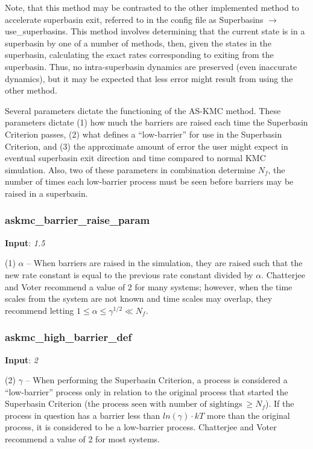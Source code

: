 \documentclass{article}
\begin{document}
Note, that this method may be contrasted to the other implemented method to accelerate superbasin exit, referred to in the config file as Superbasins $\to$ use\_superbasins.  This method involves determining that the current state is in a superbasin by one of a number of methods, then, given the states in the superbasin, calculating the exact rates corresponding to exiting from the superbasin.  Thus, no intra-superbasin dynamics are preserved (even inaccurate dynamics), but it may be expected that less error might result from using the other method.

Several parameters dictate the functioning of the AS-KMC method.  These parameters dictate (1) how much the barriers are raised each time the Superbasin Criterion passes, (2) what defines a ``low-barrier'' for use in the Superbasin Criterion, and (3) the approximate amount of error the user might expect in eventual superbasin exit direction and time compared to normal KMC simulation.  Also, two of these parameters in combination determine $N_f$, the number of times each low-barrier process must be seen before barriers may be raised in a superbasin.

\subsubsection{askmc\_barrier\_raise\_param}

\noindent\textbf{Input}:  \emph{1.5}

(1) $\alpha$ -- When barriers are raised in the simulation, they are raised such that the new rate constant is equal to the previous rate constant divided by $\alpha$. Chatterjee and Voter recommend a value of 2 for many systems; however, when the time scales from the system are not known and time scales may overlap, they recommend letting $1 \le \alpha \le \gamma^{1/2} \ll N_f$.

\subsubsection{askmc\_high\_barrier\_def}

\noindent\textbf{Input}:  \emph{2}

(2) $\gamma$ -- When performing the Superbasin Criterion, a process is considered a ``low-barrier'' process only in relation to the original process that started the Superbasin Criterion ($\text{the process seen with number of sightings}~\ge N_f$).  If the process in question has a barrier less than  $ln(\gamma) \cdot kT$ more than the original process, it is considered to be a low-barrier process.  Chatterjee and Voter recommend a value of 2 for most systems.
\end{document}
